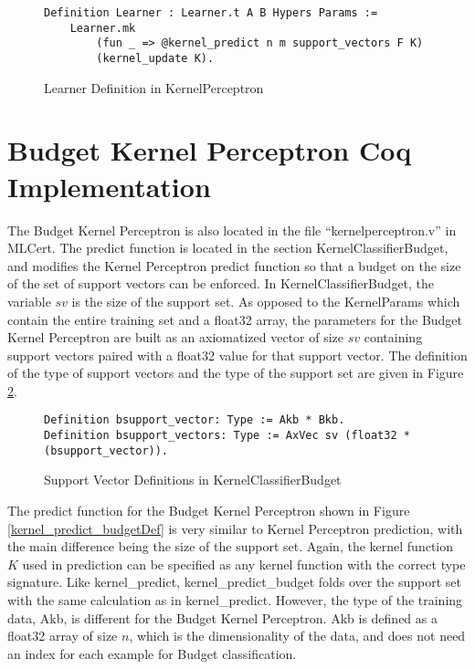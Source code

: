 \begin{figure}
    \caption{Learner Definition in KernelPerceptron}
    \label{kpLearnerDef}
    \begin{lstlisting}
Definition Learner : Learner.t A B Hypers Params :=
    Learner.mk
        (fun _ => @kernel_predict n m support_vectors F K)
        (kernel_update K).
    \end{lstlisting}
\end{figure}

\section{Budget Kernel Perceptron Coq Implementation}\label{KPBCoqImp}
The Budget Kernel Perceptron is also located in the file ``kernelperceptron.v'' in MLCert. The predict function is located in the section KernelClassifierBudget, and modifies the Kernel Perceptron predict function so that a budget on the size of the set of support vectors can be enforced. In KernelClassifierBudget, the variable $sv$ is the size of the support set. As opposed to the KernelParams which contain the entire training set and a float32 array, the parameters for the Budget Kernel Perceptron are built as an axiomatized vector of size $sv$ containing support vectors paired with a float32 value for that support vector. The definition of the type of support vectors and the type of the support set are given in Figure \ref{KPBsupportDef}. 

\begin{figure}
    \caption{Support Vector Definitions in KernelClassifierBudget}
    \label{KPBsupportDef}
    \begin{lstlisting}
Definition bsupport_vector: Type := Akb * Bkb.
Definition bsupport_vectors: Type := AxVec sv (float32 * (bsupport_vector)).
    \end{lstlisting}
\end{figure}

The predict function for the Budget Kernel Perceptron shown in Figure \ref{kernel_predict_budgetDef} is very similar to Kernel Perceptron prediction, with the main difference being the size of the support set. Again, the kernel function $K$ used in prediction can be specified as any kernel function with the correct type signature. Like kernel\_predict, kernel\_predict\_budget folds over the support set with the same calculation as in kernel\_predict. However, the type of the training data, Akb, is different for the Budget Kernel Perceptron. Akb is defined as a float32 array of size $n$, which is the dimensionality of the data, and does not need an index for each example for Budget classification.

